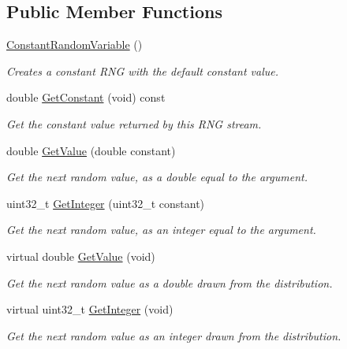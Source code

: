 \subsection*{Public Member Functions}
\begin{DoxyCompactItemize}
\item 
\hyperlink{classns3_1_1ConstantRandomVariable_a37545321878965111d5961f6e60414b0}{Constant\+Random\+Variable} ()
\begin{DoxyCompactList}\small\item\em Creates a constant R\+NG with the default constant value. \end{DoxyCompactList}\item 
double \hyperlink{classns3_1_1ConstantRandomVariable_abb42effcc9823e14b143ffd2cd1cccda}{Get\+Constant} (void) const 
\begin{DoxyCompactList}\small\item\em Get the constant value returned by this R\+NG stream. \end{DoxyCompactList}\item 
double \hyperlink{classns3_1_1ConstantRandomVariable_a4843c136931cb1a9f49838999fc2ebe0}{Get\+Value} (double constant)
\begin{DoxyCompactList}\small\item\em Get the next random value, as a double equal to the argument. \end{DoxyCompactList}\item 
uint32\+\_\+t \hyperlink{classns3_1_1ConstantRandomVariable_a7225bf0d54240f28b5349e90cdf74896}{Get\+Integer} (uint32\+\_\+t constant)
\begin{DoxyCompactList}\small\item\em Get the next random value, as an integer equal to the argument. \end{DoxyCompactList}\item 
virtual double \hyperlink{classns3_1_1ConstantRandomVariable_a7b2aa5c0e2e39cadb73756c8672eac07}{Get\+Value} (void)
\begin{DoxyCompactList}\small\item\em Get the next random value as a double drawn from the distribution. \end{DoxyCompactList}\item 
virtual uint32\+\_\+t \hyperlink{classns3_1_1ConstantRandomVariable_ab005a045840284f0cd14e1f0c30823d9}{Get\+Integer} (void)
\begin{DoxyCompactList}\small\item\em Get the next random value as an integer drawn from the distribution. \end{DoxyCompactList}\end{DoxyCompactItemize}
